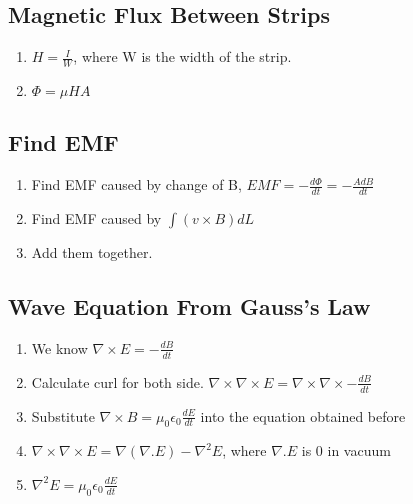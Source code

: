 \documentclass{article}
\begin{document}
   \subsection{Magnetic Flux Between Strips}
   \begin{enumerate}
   \item    $ H = \frac{I}{W} $, where W is the width of the strip.
   \item  $\Phi = \mu HA$
   \end{enumerate}
   
   \subsection{Find EMF}
   \begin{enumerate}
   \item Find EMF caused by change of B, $EMF = -\frac{d\Phi}{dt} =- \frac{A dB}{dt}$
   \item Find EMF caused by $\int (v\times B)dL$
   \item Add them together.
   \end{enumerate}

   \subsection{Wave Equation From Gauss's Law}
   
   \begin{enumerate}
     \item We know $\nabla\times E= -\frac{dB}{dt}$
     \item Calculate curl for both side. $\nabla \times \nabla \times E = \nabla \times \nabla \times -\frac{dB}{dt}$
     \item Substitute $\nabla \times B = \mu_0\epsilon_0\frac{dE}{dt}$ into the equation obtained before
     \item $\nabla \times \nabla \times E  = \nabla (\nabla .E) - \nabla^2E$, where $\nabla .E$ is 0 in vacuum
     \item $\nabla^2E = \mu_0\epsilon_0\frac{dE}{dt}$
   \end{enumerate}
  
\end{document}
